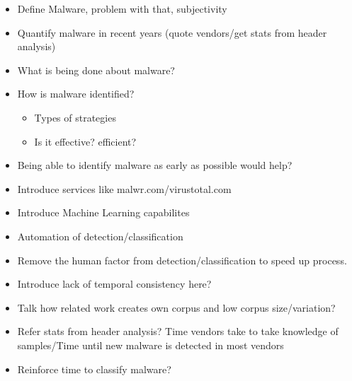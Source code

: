 \documentclass{llncs}
\begin{document}
\hfill \break


\begin{itemize}
	\item Define Malware, problem with that, subjectivity
	\item Quantify malware in recent years (quote vendors/get stats from header analysis)
	\item What is being done about malware?
	\item How is malware identified?
	\begin{itemize}
		\item Types of strategies
		\item Is it effective? efficient?
	\end{itemize}
	\item Being able to identify malware as early as possible would help?
	\item Introduce services like malwr.com/virustotal.com
	\item Introduce Machine Learning capabilites
	\item Automation of detection/classification
\end{itemize}

%




\begin{itemize}
	\item Remove the human factor from detection/classification to speed up process.
	\item Introduce lack of temporal consistency here?
	\item Talk how related work creates own corpus and low corpus size/variation?
	\item Refer stats from header analysis? Time vendors take to take knowledge of samples/Time until new malware is detected in most vendors
	\item Reinforce time to classify malware?
\end{itemize}
\end{document}
